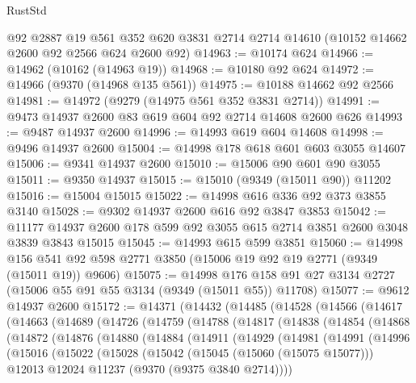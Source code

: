 \begin{lexlean}{RustStd}
\begin{coremodule}
    @92
    @2887
    @19
    @561
    @352
    @620
    @3831
    @2714
    @2714
    @14610
    (@10152 @14662 @2600 @92 @2566 @624 @2600 @92)
@14963 := @10174 @624
@14966 := @14962 (@10162 (@14963 @19))
@14968 := @10180 @92 @624
@14972 := @14966 (@9370 (@14968 @135 @561))
@14975 := @10188 @14662 @92 @2566
@14981 := @14972 (@9279 (@14975 @561 @352 @3831 @2714))
@14991 := @9473 @14937 @2600 @83 @619 @604 @92 @2714 @14608 @2600 @626
@14993 := @9487 @14937 @2600
@14996 := @14993 @619 @604 @14608
@14998 := @9496 @14937 @2600
@15004 := @14998 @178 @618 @601 @603 @3055 @14607
@15006 := @9341 @14937 @2600
@15010 := @15006 @90 @601 @90 @3055
@15011 := @9350 @14937
@15015 := @15010 (@9349 (@15011 @90)) @11202
@15016 := @15004 @15015
@15022 := @14998 @616 @336 @92 @373 @3855 @3140
@15028 := @9302 @14937 @2600 @616 @92 @3847 @3853
@15042 := @11177 @14937 @2600 @178 @599 @92 @3055 @615 @2714 @3851 @2600 @3048 @3839 @3843 @15015
@15045 := @14993 @615 @599 @3851
@15060 := @14998
    @156
    @541
    @92
    @598
    @2771
    @3850
    (@15006 @19 @92 @19 @2771 (@9349 (@15011 @19)) @9606)
@15075 := @14998
    @176
    @158
    @91
    @27
    @3134
    @2727
    (@15006 @55 @91 @55 @3134 (@9349 (@15011 @55)) @11708)
@15077 := @9612 @14937 @2600
@15172 := @14371
    (@14432
      (@14485
        (@14528
          (@14566
            (@14617
              (@14663
                (@14689
                  (@14726
                    (@14759
                      (@14788
                        (@14817
                          (@14838
                            (@14854
                              (@14868
                                (@14872
                                  (@14876
                                    (@14880
                                      (@14884
                                        (@14911
                                          (@14929
                                            (@14981
                                              (@14991
                                                (@14996
                                                  (@15016
                                                    (@15022
                                                      (@15028
                                                        (@15042
                                                          (@15045 (@15060 (@15075 @15077)))
                                                          @12013
                                                          @12024
                                                          @11237
                                                          (@9370 (@9375 @3840 @2714))))

\end{coremodule}
\end{lexlean}
